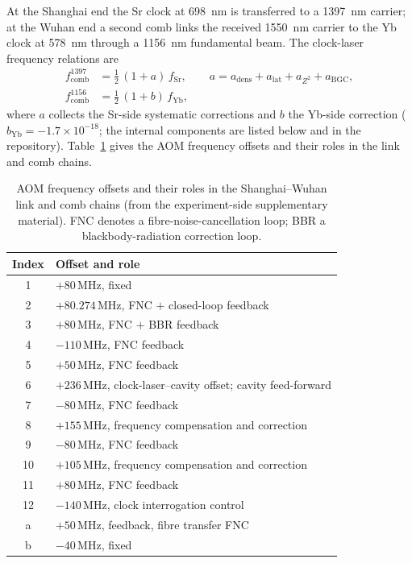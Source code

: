 \documentclass[11pt,a4paper]{article}
\newcommand{\e}[1]{\times 10^{#1}}
\begin{document}
At the Shanghai end the Sr clock at \qty{698}{nm} is transferred to a
\qty{1397}{nm} carrier; at the Wuhan end a second comb links the received
\qty{1550}{nm} carrier to the Yb clock at \qty{578}{nm} through a \qty{1156}{nm}
fundamental beam. The clock-laser frequency relations are
\begin{align}
  f_{\mathrm{comb}}^{1397} &= \tfrac{1}{2}\,(1+a)\,f_{\mathrm{Sr}},
  \qquad a = a_{\mathrm{dens}} + a_{\mathrm{lat}} + a_{Z^2} + a_{\mathrm{BGC}}, \\
  f_{\mathrm{comb}}^{1156} &= \tfrac{1}{2}\,(1+b)\,f_{\mathrm{Yb}},
\end{align}
where $a$ collects the Sr-side systematic corrections \citep{jia2026sr} and
$b$ the Yb-side correction \citep{zhu2026yb} ($b_{\mathrm{Yb}} =
-1.7\e{-18}$; the internal components are listed below and in the
repository). Table~\ref{tab:aom} gives the AOM frequency offsets and
their roles in the link and comb chains.

\begin{table}[t]
  \centering
  \caption{AOM frequency offsets and their roles in the
  Shanghai--Wuhan link and comb chains (from the experiment-side
  supplementary material). FNC denotes a fibre-noise-cancellation loop;
  BBR a blackbody-radiation correction loop.}
  \label{tab:aom}
  \begin{tabular}{cl}
    \toprule
    Index & Offset and role \\
    \midrule
    1  & $+80$\,MHz, fixed \\
    2  & $+80.274$\,MHz, FNC $+$ closed-loop feedback \\
    3  & $+80$\,MHz, FNC $+$ BBR feedback \\
    4  & $-110$\,MHz, FNC feedback \\
    5  & $+50$\,MHz, FNC feedback \\
    6  & $+236$\,MHz, clock-laser--cavity offset; cavity feed-forward \\
    7  & $-80$\,MHz, FNC feedback \\
    8  & $+155$\,MHz, frequency compensation and correction \\
    9  & $-80$\,MHz, FNC feedback \\
    10 & $+105$\,MHz, frequency compensation and correction \\
    11 & $+80$\,MHz, FNC feedback \\
    12 & $-140$\,MHz, clock interrogation control \\
    a  & $+50$\,MHz, feedback, fibre transfer FNC \\
    b  & $-40$\,MHz, fixed \\
    \bottomrule
  \end{tabular}
\end{table}
\end{document}
